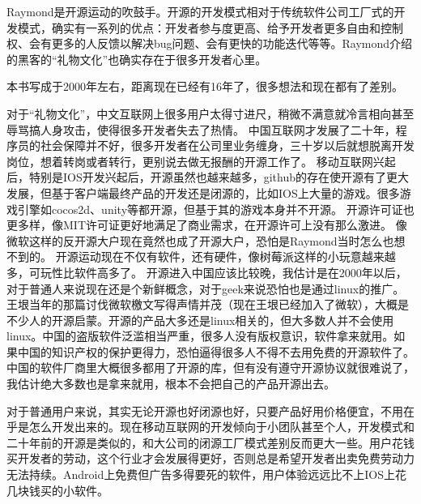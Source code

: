 Raymond是开源运动的吹鼓手。开源的开发模式相对于传统软件公司工厂式的开发模式，确实有一系列的优点：开发者参与度更高、给予开发者更多自由和控制权、会有更多的人反馈以解决bug问题、会有更快的功能迭代等等。Raymond介绍的黑客的“礼物文化”也确实存在于很多开发者心里。

本书写成于2000年左右，距离现在已经有16年了，很多想法和现在都有了差别。

对于“礼物文化”，中文互联网上很多用户太得寸进尺，稍微不满意就冷言相向甚至辱骂搞人身攻击，使得很多开发者失去了热情。
中国互联网才发展了二十年，程序员的社会保障并不好，很多开发者在公司里业务缠身，三十岁以后就想脱离开发岗位，想着转岗或者转行，更别说去做无报酬的开源工作了。
移动互联网兴起后，特别是IOS开发兴起后，开源虽然也越来越多，github的存在使开源有了更大发展，但基于客户端最终产品的开发还是闭源的，比如IOS上大量的游戏。很多游戏引擎如cocos2d、unity等都开源，但基于其的游戏本身并不开源。
开源许可证也更多样，像MIT许可证更好地满足了商业需求，在开源许可上没有那么激进。
像微软这样的反开源大户现在竟然也成了开源大户，恐怕是Raymond当时怎么也想不到的。
开源运动现在不仅有软件，还有硬件，像树莓派这样的小玩意越来越多，可玩性比软件高多了。
开源进入中国应该比较晚，我估计是在2000年以后，对于普通人来说现在还是个新鲜概念，对于geek来说恐怕也是通过linux的推广。王垠当年的那篇讨伐微软檄文写得声情并茂（现在王垠已经加入了微软），大概是不少人的开源启蒙。开源的产品大多还是linux相关的，但大多数人并不会使用linux。中国的盗版软件泛滥相当严重，很多人没有版权意识，软件拿来就用。如果中国的知识产权的保护更得力，恐怕逼得很多人不得不去用免费的开源软件了。中国的软件厂商里大概很多都用了开源的库，但有没有遵守开源协议就很难说了，我估计绝大多数也是拿来就用，根本不会把自己的产品开源出去。

对于普通用户来说，其实无论开源也好闭源也好，只要产品好用价格便宜，不用在乎是怎么开发出来的。现在移动互联网的开发倾向于小团队甚至个人，开发模式和二十年前的开源是类似的，和大公司的闭源工厂模式差别反而更大一些。用户花钱买开发者的劳动，这个行业才会发展得更好，否则总是希望开发者出卖免费劳动力无法持续。Android上免费但广告多得要死的软件，用户体验远远比不上IOS上花几块钱买的小软件。